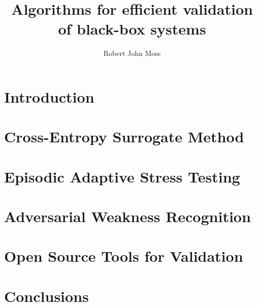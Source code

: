 \documentclass[11pt]{report}
\begin{document}
\title{Algorithms for efficient validation of black-box systems}
\author{Robert John Moss}

\beforepreface
{}

%

\afterpreface

\renewcommand{\chaptermark}[1]{ \markboth{\textsc{#1}}{} }
\renewcommand{\sectionmark}[1]{ \markright{\textsc{#1}}{} }

\chapter{Introduction}\label{cha:introduction}


\chapter{Cross-Entropy Surrogate Method}\label{cha:cem_variants}


\chapter{Episodic Adaptive Stress Testing}\label{cha:episodic_ast}


\chapter{Adversarial Weakness Recognition}\label{cha:weakness_rec}


\chapter{Open Source Tools for Validation}\label{cha:tooling}


\chapter{Conclusions}\label{cha:conclusions}


\appendix


\printbibliography
\end{document}
